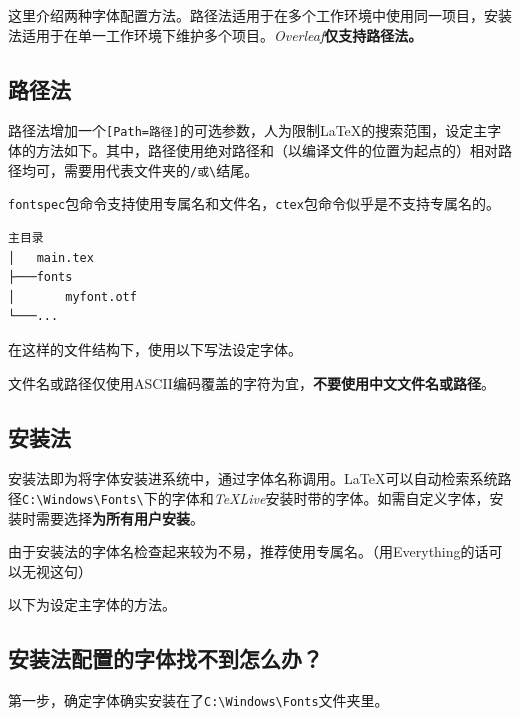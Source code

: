 \documentclass[10pt,openany]{book}
\begin{document}
\begin{sloppypar}
    这里介绍两种字体配置方法。路径法适用于在多个工作环境中使用同一项目，安装法适用于在单一工作环境下维护多个项目。\textit{Overleaf}\textbf{仅支持路径法。}

    \subsection{路径法}

    路径法增加一个\texttt{{[}Path=路径{]}}的可选参数，人为限制{\LaTeX}的搜索范围，设定主字体的方法如下。其中，路径使用绝对路径和（以编译文件的位置为起点的）相对路径均可，需要用代表文件夹的\texttt{/或\textbackslash{}}结尾。

    \texttt{fontspec}包命令支持使用专属名和文件名，\texttt{ctex}包命令似乎是不支持专属名的。

    \begin{lstlisting}[title=文件结构示例]
主目录
│   main.tex
├───fonts
│       myfont.otf
└───...
\end{lstlisting}

    在这样的文件结构下，使用以下写法设定字体。

    

    文件名或路径仅使用ASCII编码覆盖的字符为宜，\textbf{不要使用中文文件名或路径}。

    \subsection{安装法}

    安装法即为将字体安装进系统中，通过字体名称调用。{\LaTeX}可以自动检索系统路径\texttt{C:\textbackslash{}Windows\textbackslash{}Fonts\textbackslash{}}下的字体和\textit{TeXLive}安装时带的字体。如需自定义字体，安装时需要选择\textbf{为所有用户安装}。

    由于安装法的字体名检查起来较为不易，推荐使用专属名。（用Everything的话可以无视这句）

    以下为设定主字体的方法。

    

    \subsection{安装法配置的字体找不到怎么办？}

    第一步，确定字体确实安装在了\texttt{C:\textbackslash{}Windows\textbackslash{}Fonts}文件夹里。


\end{sloppypar}
\end{document}
